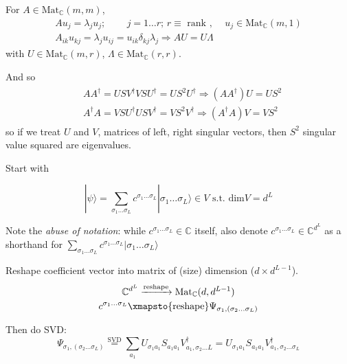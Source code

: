 \documentclass[10pt]{amsart}
\begin{document}
\begin{multicols*}{2}
For $A \in \text{Mat}_{\mathbb{C}}(m,m)$, 
\[
\begin{gathered}
	Au_j = \lambda_j u_j ; \qquad \, j =1 \dots r ; \, r \equiv \text{ rank }, \quad \, u_j \in \text{Mat}_{\mathbb{C}}(m, 1) \\
	A_{ik} u_{kj} = \lambda_j u_{ij} = u_{ik} \delta_{kj} \lambda_j \Longrightarrow AU = U \Lambda
\end{gathered}
\]
with $U \in \text{Mat}_{\mathbb{C}}(m, r)$, $\Lambda \in \text{Mat}_{\mathbb{C}}(r, r)$.

And so
\[
\begin{gathered}
\begin{aligned}
& AA^{\dagger} = USV^{\dagger} VSU^{\dagger} = US^2 U^{\dagger} \Longrightarrow (AA^{\dagger})U = US^2 \\ 
& A^{\dagger} A = VSU^{\dagger} U SV^{\dagger} = VS^2 V^{\dagger} \Longrightarrow (A^{\dagger}A)V = VS^2
\end{aligned}
\end{gathered}
\]
so if we treat $U$ and $V$, matrices of left, right singular vectors, then $S^2$ singular value squared are eigenvalues.

Start with 

\begin{equation}
| \psi \rangle = \sum_{\sigma_1 \dots \sigma_L} c^{\sigma_1 \dots \sigma_L} | \sigma_1 \dots \sigma_L \rangle \in V \text{ s.t. } \text{dim} V = d^L
\end{equation}

Note the \emph{abuse of notation}: while $c^{\sigma_1 \dots \sigma_L} \in \mathbb{C}$ itself, also denote $c^{\sigma_1 \dots \sigma_L} \in \mathbb{C}^{d^L}$ as a shorthand for $\sum_{\sigma_1 \dots \sigma_L} c^{\sigma_1 \dots \sigma_L} | \sigma_1 \dots \sigma_L \rangle$

Reshape coefficient vector into matrix of (size) dimension ($d\times d^{L-1}$). 
\[
\begin{gathered}
\mathbb{C}^{d^L} \xrightarrow{\text{reshape}} \text{Mat}_{\mathbb{C}}(d, d^{L-1}) \\
c^{\sigma_1 \dots \sigma_L} \xmapsto{\text{reshape}} \Psi_{\sigma_1, (\sigma_2 \dots \sigma_L)} 
\end{gathered}
\]

Then do SVD:
\[
\Psi_{\sigma_1, (\sigma_2 \dots \sigma_L)}  \stackrel{ \text{SVD} }{=} \sum_{a_1} U_{\sigma_1 a_1} S_{a_1 a_1} V^{\dagger}_{a_1, \sigma_2 \dots L} = U_{\sigma_1 a_1} S_{a_1 a_1 } V^{\dagger}_{a_1, \sigma_2 \dots \sigma_L}
\]



\end{multicols*}
\end{document}

